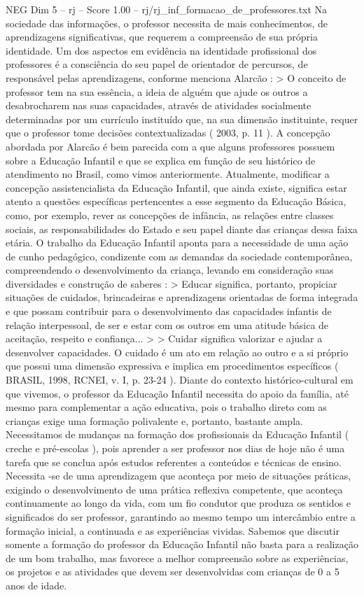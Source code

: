 \begin{textsample}{NEG Dim 5 – rj – Score 1.00 – rj/rj\_inf\_formacao\_de\_professores.txt}
Na sociedade das informações, o professor necessita de mais conhecimentos, de aprendizagens significativas, que requerem a compreensão de sua própria identidade.
Um dos aspectos em evidência na identidade profissional dos professores é a consciência do seu papel de orientador de percursos, de responsável pelas aprendizagens, conforme menciona Alarcão : > O conceito de professor tem na sua essência, a ideia de alguém que ajude os outros a desabrocharem nas suas capacidades, através de atividades socialmente determinadas por um currículo instituído que, na sua dimensão instituinte, requer que o professor tome decisões contextualizadas ( 2003, p. 11 ).
A concepção abordada por Alarcão é bem parecida com a que alguns professores possuem sobre a Educação Infantil e que se explica em função de seu histórico de atendimento no Brasil, como vimos anteriormente.
Atualmente, modificar a concepção assistencialista da Educação Infantil, que ainda existe, significa estar atento a questões específicas pertencentes a esse segmento da Educação Básica, como, por exemplo, rever as concepções de infância, as relações entre classes sociais, as responsabilidades do Estado e seu papel diante das crianças dessa faixa etária.
O trabalho da Educação Infantil aponta para a necessidade de uma ação de cunho pedagógico, condizente com as demandas da sociedade contemporânea, compreendendo o desenvolvimento da criança, levando em consideração suas diversidades e construção de saberes : > Educar significa, portanto, propiciar situações de cuidados, brincadeiras e aprendizagens orientadas de forma integrada e que possam contribuir para o desenvolvimento das capacidades infantis de relação interpessoal, de ser e estar com os outros em uma atitude básica de aceitação, respeito e confiança... > > Cuidar significa valorizar e ajudar a desenvolver capacidades.
O cuidado é um ato em relação ao outro e a si próprio que possui uma dimensão expressiva e implica em procedimentos específicos ( BRASIL, 1998, RCNEI, v.
I, p. 23-24 ).
Diante do contexto histórico-cultural em que vivemos, o professor da Educação Infantil necessita do apoio da família, até mesmo para complementar a ação educativa, pois o trabalho direto com as crianças exige uma formação polivalente e, portanto, bastante ampla.
Necessitamos de mudanças na formação dos profissionais da Educação Infantil ( creche e pré-escolas ), pois aprender a ser professor nos dias de hoje não é uma tarefa que se conclua após estudos referentes a conteúdos e técnicas de ensino.
Necessita -se de uma aprendizagem que aconteça por meio de situações práticas, exigindo o desenvolvimento de uma prática reflexiva competente, que aconteça continuamente ao longo da vida, com um fio condutor que produza os sentidos e significados do ser professor, garantindo ao mesmo tempo um intercâmbio entre a formação inicial, a continuada e as experiências vividas.
Sabemos que discutir somente a formação do professor da Educação Infantil não basta para a realização de um bom trabalho, mas favorece a melhor compreensão sobre as experiências, os projetos e as atividades que devem ser desenvolvidas com crianças de 0 a 5 anos de idade.

\end{textsample}
